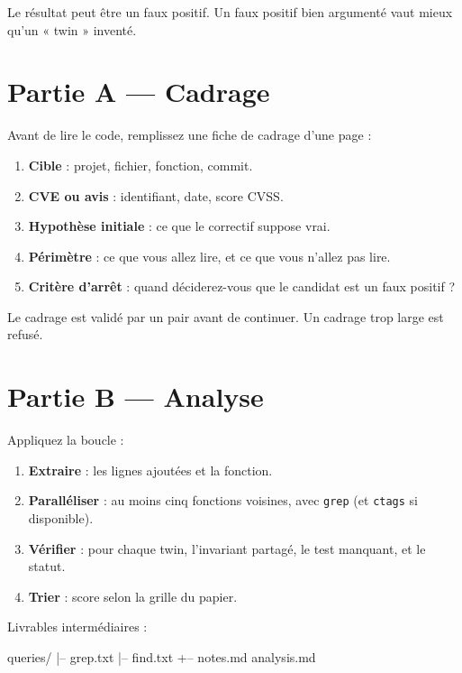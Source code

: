 \documentclass{training}
\begin{document}
Le résultat peut être un faux positif. Un faux positif bien argumenté vaut
mieux qu'un « twin » inventé.

\chapter{Partie A --- Cadrage}

Avant de lire le code, remplissez une fiche de cadrage d'une page :

\begin{enumerate}
  \item \textbf{Cible} : projet, fichier, fonction, commit.
  \item \textbf{CVE ou avis} : identifiant, date, score CVSS.
  \item \textbf{Hypothèse initiale} : ce que le correctif suppose vrai.
  \item \textbf{Périmètre} : ce que vous allez lire, et ce que vous
        n'allez pas lire.
  \item \textbf{Critère d'arrêt} : quand déciderez-vous que le candidat
        est un faux positif ?
\end{enumerate}

Le cadrage est validé par un pair avant de continuer. Un cadrage trop large
est refusé.

\chapter{Partie B --- Analyse}

Appliquez la boucle :

\begin{enumerate}
  \item \textbf{Extraire} : les lignes ajoutées et la fonction.
  \item \textbf{Paralléliser} : au moins cinq fonctions voisines, avec
        \texttt{grep} (et \texttt{ctags} si disponible).
  \item \textbf{Vérifier} : pour chaque twin, l'invariant partagé, le test
        manquant, et le statut.
  \item \textbf{Trier} : score selon la grille du papier.
\end{enumerate}

Livrables intermédiaires :

\begin{console}
queries/
|-- grep.txt
|-- find.txt
+-- notes.md
analysis.md
\end{console}
\end{document}

